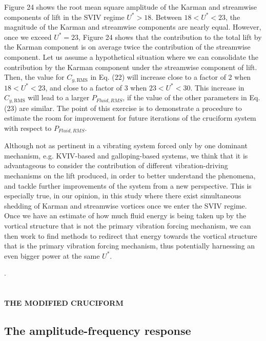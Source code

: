 \documentclass[]{article}
\begin{document}
Figure 24 shows the root mean square amplitude of the Karman and
streamwise components of lift in the SVIV regime \(U^{*} > 18\). Between
\(18 < U^{*} < 23\), the magnitude of the Karman and streamwise
components are nearly equal. However, once we exceed \(U^{*} = 23\),
Figure 24 shows that the contribution to the total lift by the Karman
component is on average twice the contribution of the streamwise
component. Let us assume a hypothetical situation where we can
consolidate the contribution by the Karman component under the
streamwise component of lift. Then, the value for \(C_{y,\text{RMS}}\)
in Eq. (22) will increase close to a factor of 2 when
\(18 < U^{*} < 23\), and close to a factor of
\protect\hypertarget{_Hlk24566759}{}{}3 when \(23 < U^{*} < 30\). This
increase in \(C_{y,\text{RMS}}\) will lead to a larger
\(P_{Fluid,RMS}\), if the value of the other parameters in Eq. (23) are
similar. The point of this exercise is to demonstrate a procedure to
estimate the room for improvement for future iterations of the cruciform
system with respect to
\(P_{Fluid,RMS}\).\protect\hypertarget{currentlyWorking}{}{}

Although not as pertinent in a vibrating system forced only by one
dominant mechanism, e.g. KVIV-based and galloping-based systems, we
think that it is advantageous to consider the contribution of different
vibration-driving mechanisms on the lift produced, in order to better
understand the phenomena, and tackle further improvements of the system
from a new perspective. This is especially true, in our opinion, in this
study where there exist simultaneous shedding of Karman and streamwise
vortices once we enter the SVIV regime. Once we have an estimate of how
much fluid energy is being taken up by the vortical structure that is
not the primary vibration forcing mechanism, we can then work to find
methods to redirect that energy towards the vortical structure that is
the primary vibration forcing mechanism, thus potentially harnessing an
even bigger power at the same \(U^{*}\).

.

\hypertarget{section-4}{\section{}\label{section-4}}

\textbf{THE MODIFIED CRUCIFORM}

\hypertarget{the-amplitude-frequency-response}{\subsection{The
amplitude-frequency response}\label{the-amplitude-frequency-response}}
\end{document}
